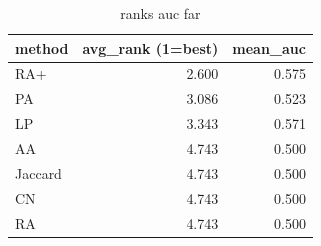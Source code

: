 \begin{table}[t]
\centering
\caption{ranks auc far}
\label{tab:ranks_auc_far}
\begin{tabular}{lrr}
\hline
method & avg\_rank (1=best) & mean\_auc \\
\hline
RA+ & 2.600 & 0.575 \\
PA & 3.086 & 0.523 \\
LP & 3.343 & 0.571 \\
AA & 4.743 & 0.500 \\
Jaccard & 4.743 & 0.500 \\
CN & 4.743 & 0.500 \\
RA & 4.743 & 0.500 \\
\hline
\end{tabular}
\end{table}